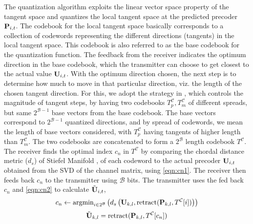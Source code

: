 \documentclass[conference]{IEEEtran}
\begin{document}
The quantization algorithm exploits the linear vector space property of the tangent space and quantizes the local tangent space at the predicted precoder ${\bf P}_{i,t}$.
The codebook for the local tangent space basically corresponds to a collection of codewords representing the different directions (tangents) in the local tangent space.
This codebook is also referred to as the base codebook for the quantization function.
The feedback from the receiver indicates the optimum direction in the base codebook, which the transmitter can choose to get closest to the actual value ${\bf U}_{i,t}$.
With the optimum direction chosen, the next step is to determine how much to move in that particular direction, viz. the length of the chosen tangent direction.
For this, we adopt the strategy in \cite{6891198}, which
controls the magnitude of tangent steps, by having two codebooks
$T^{\mathcal{C}}_p,T^{\mathcal{C}}_m$ of different spreads, but same
$2^{\mathcal{B}-1}$ base vectors from the base codebook. 
The base vectors correspond to $2^{\mathcal{B}-1}$ quantized directions, and by spread of codewords, we mean the length of base vectors considered, with $T^{\mathcal{C}}_p$ having tangents of higher length than $T^{\mathcal{C}}_m$. 
The two codebooks are concatenated to form a $2^\mathcal{B}$ length codebook $T^\mathcal{C}$. 
The receiver finds the optimal index $c_n$ in $T^\mathcal{C}$ by comparing the chordal distance metric ($d_s$) of Stiefel Manifold \cite{Gupt1905:Predictive,6891198}, of each codeword to the actual precoder ${\bf U}_{i,t}$ obtained from the SVD of the channel matrix, using \eqref{eqn:cn1}. The receiver then feeds back $c_n$ to the transmitter using $\mathcal{B}$ bits. The transmitter uses the fed back $c_n$ and \eqref{eqn:cn2} to calculate $\tilde{{\bf U}}_{i,t}$,
\begin{equation}
\label{eqn:cn1}
c_n \gets \text{argmin}_{i \in 2^\mathcal{B}}\left (d_s\left (\bU_{k,l},\text{retract}(\bP_{k,l},T^\mathcal{C}[i])\right ) \right)
\end{equation}
\begin{equation}
\tilde{\bU}_{k,l}=\text{retract}(\bP_{k,l},T^\mathcal{C}[c_n])
\label{eqn:cn2}
\end{equation}
\end{document}
